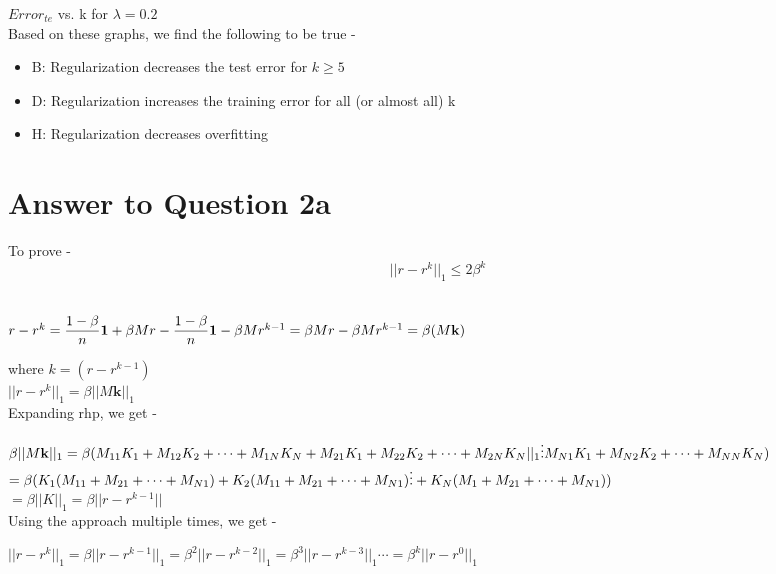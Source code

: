\documentclass[11pt]{article}
\begin{document}
{$Error_{te}$ vs. k for $ \lambda = 0.2$\\

Based on these graphs, we find the following to be true - 
\begin{itemize}
\item B: Regularization decreases the test error for $k \geq 5$
\item D: Regularization increases the training error for all (or almost all) k
\item H: Regularization decreases overfitting
\end{itemize}


\pagebreak[4]
\section*{Answer to Question 2a}
To prove - 
$$||r - r^k||_1 \leq 2 \beta^k$$\

$
r - r^k = \dfrac{1-\beta}{n}\mathbf{1} + \beta M r - \dfrac{1-\beta}{n}\mathbf{1} - \beta M r^{k-1} 
= \beta M r - \beta M r^{k-1}  = \beta (M \mathbf{k}) \\
$

where $k = (r - r^{k-1})$\\

$||r - r^k||_1 = \beta || M \mathbf{k}||_1$ \\

Expanding rhp, we get - \

$
\beta || M \mathbf{k}||_1 \\
 = \beta (M_{11}K_1 + M_{12}K_2 + \cdots + M_{1N}K_N + \\
 M_{21}K_1 + M_{22}K_2 + \cdots + M_{2N}K_N ||_1 \\
 \vdots \\
  M_{N1}K_1 + M_{N2}K_2 + \cdots + M_{NN}K_N)
$\\

$
= \beta (K_1(M_{11} + M_{21} + \cdots + M_{N1})  \\ 
+ K_2(M_{11} + M_{21} + \cdots + M_{N1})  \\
\vdots \\
+ K_N(M_{1} + M_{21} + \cdots + M_{N1}))
$ \\

$ = \beta || K ||_1 = \beta ||r-r^{k-1}||$ \\

Using the approach multiple times, we get - 

$
||r - r^k||_1 = \beta ||r-r^{k-1}||_1 = \beta^2 ||r-r^{k-2}||_1 = \beta^3 ||r-r^{k-3}||_1 \cdots = \beta^k ||r-r^{0}||_1
$ \\

}
\end{document}
